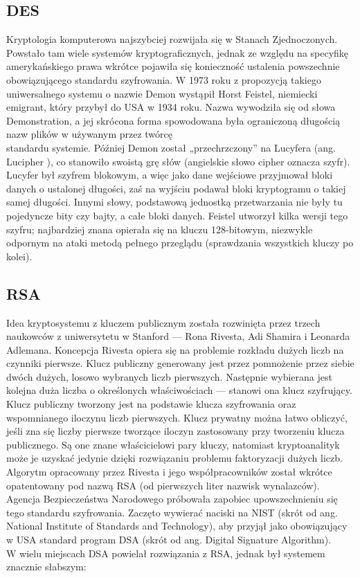 \documentclass[a4paper]{article}
\begin{document}
\subsection{DES}
Kryptologia komputerowa najszybciej rozwijała się w Stanach Zjednoczonych. Powstało tam wiele
systemów kryptograficznych, jednak ze względu na specyfikę amerykańskiego prawa wkrótce pojawiła się konieczność ustalenia powszechnie obowiązującego standardu szyfrowania. W 1973 roku
z propozycją takiego uniwersalnego systemu o nazwie Demon wystąpił Horst Feistel, niemiecki
emigrant, który przybył do USA w 1934 roku. Nazwa wywodziła się od słowa Demonstration, a jej
skrócona forma spowodowana była ograniczoną długością nazw plików w używanym przez twórcę\\
standardu systemie. Później Demon został „przechrzczony” na Lucyfera (ang. Lucipher ), co stanowiło swoistą grę słów (angielskie słowo cipher oznacza szyfr). Lucyfer był szyfrem blokowym, a
więc jako dane wejściowe przyjmował bloki danych o ustalonej długości, zaś na wyjściu podawał
bloki kryptogramu o takiej samej długości. Innymi słowy, podstawową jednostką przetwarzania
nie były tu pojedyncze bity czy bajty, a całe bloki danych. Feistel utworzył kilka wersji tego szyfru; najbardziej znana opierała się na kluczu 128-bitowym, niezwykle odpornym na ataki metodą
pełnego przeglądu (sprawdzania wszystkich kluczy po kolei).
\subsection{RSA}
Idea kryptosystemu z kluczem publicznym została rozwinięta przez trzech naukowców z uniwersytetu w Stanford — Rona Rivesta, Adi Shamira i Leonarda Adlemana. Koncepcja Rivesta opiera
się na problemie rozkładu dużych liczb na czynniki pierwsze. Klucz publiczny generowany jest
przez pomnożenie przez siebie dwóch dużych, losowo wybranych liczb pierwszych. Następnie wybierana jest kolejna duża liczba o określonych właściwościach — stanowi ona klucz szyfrujący.
Klucz publiczny tworzony jest na podstawie klucza szyfrowania oraz wspomnianego iloczynu liczb
pierwszych. Klucz prywatny można łatwo obliczyć, jeśli zna się liczby pierwsze tworzące iloczyn
zastosowany przy tworzeniu klucza publicznego. Są one znane właścicielowi pary kluczy, natomiast
kryptoanalityk może je uzyskać jedynie dzięki rozwiązaniu problemu faktoryzacji dużych liczb.
Algorytm opracowany przez Rivesta i jego współpracowników został wkrótce opatentowany pod
nazwą RSA (od pierwszych liter nazwisk wynalazców). Agencja Bezpieczeństwa Narodowego próbowała zapobiec upowszechnieniu się tego standardu szyfrowania. Zaczęto wywierać naciski na
NIST (skrót od ang. National Institute of Standards and Technology), aby przyjął jako obowiązujący w USA standard program DSA (skrót od ang. Digital Signature Algorithm).\\
W wielu miejscach DSA powielał rozwiązania z RSA, jednak był systemem znacznie słabszym:\\
\end{document}
